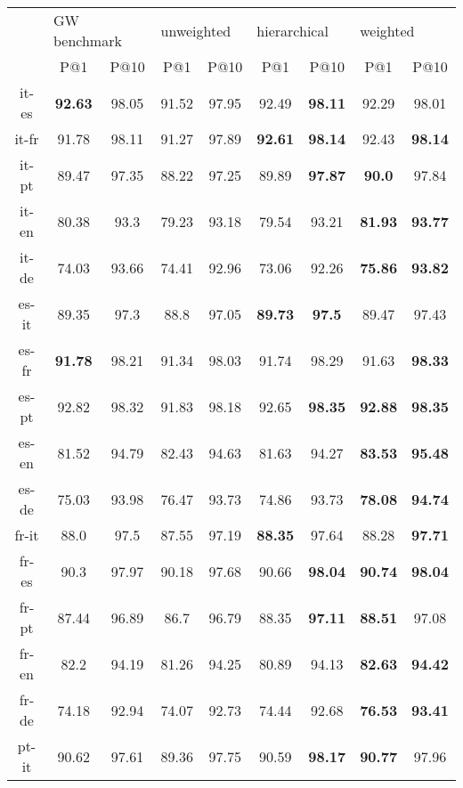\documentclass{article}
\begin{document}
\iffalse
\begin{table*}[t]
\centering
\begin{tabular}{c|cc|cc|cc|cc}
\hline
& \multicolumn{2}{l}{GW benchmark} & \multicolumn{2}{l}{unweighted} &
\multicolumn{2}{l}{hierarchical} &
\multicolumn{2}{l}{weighted}
\\
& P@1 & P@10 & P@1 & P@10 & P@1 & P@10 & P@1 & P@10 \\
\hline 
it-es  &  \bf 92.63  &  98.05  &  91.52  &  97.95  &  92.49  &  \bf 98.11  &  92.29  &  98.01 \\
it-fr  &  91.78  &  98.11  &  91.27  &  97.89  &  \bf 92.61  &  \bf 98.14  &  92.43  &  \bf 98.14 \\
it-pt  &  89.47  &  97.35  &  88.22  &  97.25  &  89.89  &  \bf 97.87  &  \bf 90.0  &  97.84 \\
it-en  &  80.38  &  93.3  &  79.23  &  93.18  &  79.54  &  93.21  &  \bf 81.93  &  \bf 93.77 \\
it-de  &  74.03  &  93.66  &  74.41  &  92.96  &  73.06  &  92.26  &  \bf 75.86  &  \bf 93.82 \\
es-it  &  89.35  &  97.3  &  88.8  &  97.05  &  \bf 89.73  &  \bf 97.5  &  89.47  &  97.43 \\
es-fr  &  \bf 91.78  &  98.21  &  91.34  &  98.03  &  91.74  &  98.29  &  91.63  &  \bf 98.33 \\
es-pt  &  92.82  &  98.32  &  91.83  &  98.18  &  92.65  &  \bf 98.35  &  \bf 92.88  &  \bf 98.35 \\
es-en  &  81.52  &  94.79  &  82.43  &  94.63  &  81.63  &  94.27  &  \bf 83.53  &  \bf 95.48 \\
es-de  &  75.03  &  93.98  &  76.47  &  93.73  &  74.86  &  93.73  &  \bf 78.08  &  \bf 94.74 \\
fr-it  &  88.0  &  97.5  &  87.55  &  97.19  &  \bf 88.35  &  97.64  &  88.28  &  \bf 97.71 \\
fr-es  &  90.3  &  97.97  &  90.18  &  97.68  &  90.66  &  \bf 98.04  &  \bf 90.74  &  \bf 98.04 \\
fr-pt  &  87.44  &  96.89  &  86.7  &  96.79  &  88.35  &  \bf 97.11  &  \bf 88.51  &  97.08 \\
fr-en  &  82.2  &  94.19  &  81.26  &  94.25  &  80.89  &  94.13  &  \bf 82.63  &  \bf 94.42 \\
fr-de  &  74.18  &  92.94  &  74.07  &  92.73  &  74.44  &  92.68  &  \bf 76.53  &  \bf 93.41 \\
pt-it  &  90.62  &  97.61  &  89.36  &  97.75  &  90.59  &  \bf 98.17  &  \bf 90.77  &  97.96 \\

\end{tabular}
\end{table*}
\end{document}
